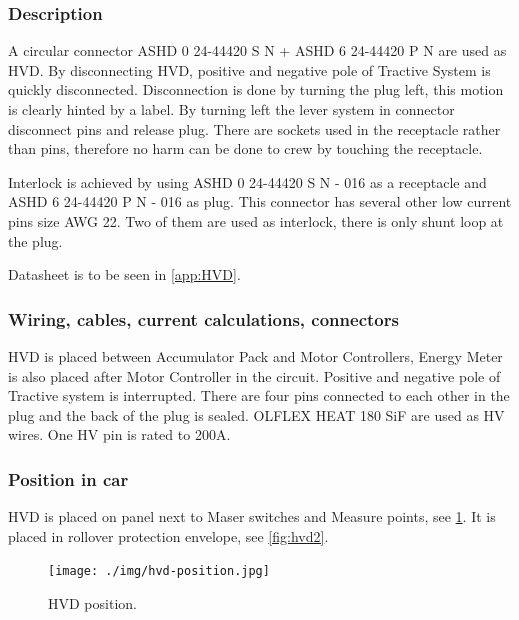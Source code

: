 \subsubsection{Description}

A circular connector ASHD 0 24-44420 S N + ASHD 6 24-44420 P N are used as HVD. By disconnecting HVD, positive and negative pole of Tractive System is quickly disconnected. Disconnection is done by turning the plug left, this motion is clearly hinted by a label. By turning left the lever system in connector disconnect pins and release plug. There are sockets used in the receptacle rather than pins, therefore no harm can be done to crew by touching the receptacle. 

Interlock is achieved by using ASHD 0 24-44420 S N - 016 as a receptacle and ASHD 6 24-44420 P N - 016 as plug. This connector has several other low current pins size AWG 22. Two of them are used as interlock, there is only shunt loop at the plug.

Datasheet is to be seen in \ref{app:HVD}.

\subsubsection{Wiring, cables, current calculations, connectors}

HVD is placed between Accumulator Pack and Motor Controllers, Energy Meter is also placed after Motor Controller in the circuit. Positive and negative pole of Tractive system is interrupted. There are four pins connected to each other in the plug and the back of the plug is sealed. OLFLEX HEAT 180 SiF are used as HV wires. One HV pin is rated to 200A.

\subsubsection{Position in car}

HVD is placed on panel next to Maser switches and Measure points, see \ref{fig:hvd-position}. It is placed in rollover protection envelope, see \ref{fig:hvd2}.

\begin{figure}[H]
	\centering
	\texttt{[image: ./img/hvd-position.jpg]}
	\caption{HVD position.}
	\label{fig:hvd-position}
\end{figure}

